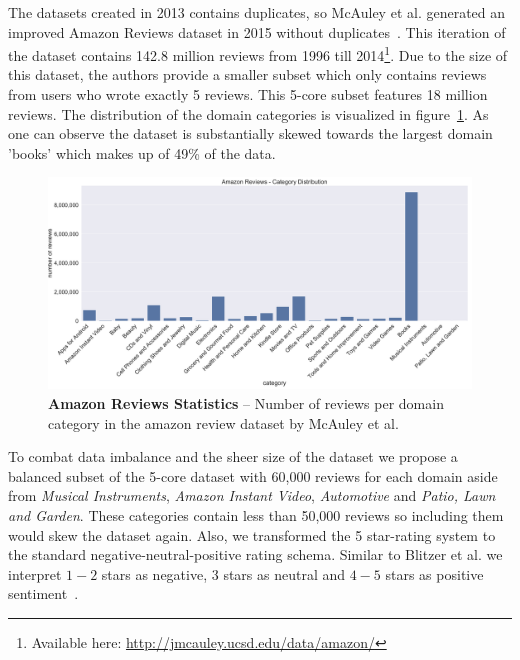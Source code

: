 The datasets created in 2013 contains duplicates, so McAuley et al. generated an improved Amazon Reviews dataset in 2015 without duplicates~\cite{McAuley2015}\cite{He2016}. This iteration of the dataset contains 142.8 million reviews from 1996 till 2014\footnote{Available here: \url{http://jmcauley.ucsd.edu/data/amazon/}}. Due to the size of this dataset, the authors provide a smaller subset which only contains reviews from users who wrote exactly 5 reviews. This 5-core subset features 18 million reviews. The distribution of the domain categories is visualized in figure~\ref{fig:05_amazonDatasetDistributin}. As one can observe the dataset is substantially skewed towards the largest domain 'books' which makes up of 49\% of the data.
\medskip

\begin{figure}
    \centering
    \includegraphics[width=\textwidth]{figures/05_setup/05_amazonReviewsCategories}
    \caption{\textbf{Amazon Reviews Statistics} -- Number of reviews per domain category in the amazon review dataset by McAuley et al.~\cite{McAuley2015}}
    \label{fig:05_amazonDatasetDistributin}
\end{figure}

To combat data imbalance and the sheer size of the dataset we propose a balanced subset of the 5-core dataset with 60,000 reviews for each domain aside from \textit{Musical Instruments}, \textit{Amazon Instant Video}, \textit{Automotive} and \textit{Patio, Lawn and Garden}. These categories contain less than 50,000 reviews so including them would skew the dataset again. Also, we transformed the 5 star-rating system to the standard negative-neutral-positive rating schema. Similar to Blitzer et al. we interpret $1-2$ stars as negative, 3 stars as neutral and $4-5$ stars as positive sentiment~\cite{Blitzer2007}.
\medskip

